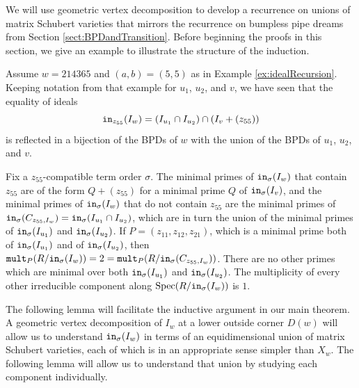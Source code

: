 \documentclass[12pt,reqno]{amsart}
\newtheorem{Main Conjecture}[theorem]{Main Conjecture}
\theoremstyle{remark}
\newenvironment{example}
  {\pushQED{\qed}\renewcommand{\qedsymbol}{$\diamondsuit$}\examplex}
  {\popQED\endexamplex}
\theoremstyle{plain}
\newcommand{\init}{{\tt in}}
\newcommand{\mult}{{\tt mult}}
\newcommand{\spec}{{\mbox{Spec}}}
\begin{document}
We will use geometric vertex decomposition to develop a recurrence on unions of matrix Schubert varieties that mirrors the recurrence on bumpless pipe dreams from Section \ref{sect:BPDandTransition}.  Before beginning the proofs in this section, we give an example to illustrate the structure of the induction. 

\begin{example}
Assume $w = 214365$ and $(a,b) = (5,5)$ as in Example \ref{ex:idealRecursion}.   Keeping notation from that example for $u_1$, $u_2$, and $v$, we have seen that the equality of ideals \[
\init_{z_{55}}(I_w) = (I_{u_1} \cap I_{u_2}) \cap (I_{v}+(z_{55}))
\] is reflected in a bijection of the BPDs of $w$ with the union of the BPDs of $u_1$, $u_2$, and $v$.

 Fix a $z_{55}$-compatible term order $\sigma$. The minimal primes of $\init_\sigma (I_w)$ that contain $z_{55}$ are of the form $Q+(z_{55})$ for a minimal prime $Q$ of $\init_\sigma(I_v)$, and the minimal primes of $\init_\sigma (I_w)$ that do not contain $z_{55}$ are the minimal primes of $\init_\sigma(C_{z_{55},I_w}) = \init_\sigma(I_{u_1} \cap I_{u_2})$, which are in turn the union of the minimal primes of $\init_\sigma(I_{u_1})$ and $\init_\sigma(I_{u_2})$.  If $P = (z_{11},z_{12},z_{21})$, which is a minimal prime both of $\init_\sigma(I_{u_1})$ and of $\init_\sigma(I_{u_2})$, then $\mult_P(R/\init_\sigma(I_w)) = 2=\mult_P(R/\init_\sigma(C_{z_{55},I_w}))$.  There are no other primes which are minimal over both $\init_\sigma(I_{u_1})$ and $\init_\sigma(I_{u_2})$.  The multiplicity of every other irreducible component along $\spec(R/\init_\sigma(I_w))$ is $1$.
\end{example}

The following lemma will facilitate the inductive argument in our main theorem.  A geometric vertex decomposition of $I_w$ at a lower outside corner $D(w)$ will allow us to understand $\init_\sigma(I_w)$ in terms of an equidimensional union of matrix Schubert varieties, each of which is in an appropriate sense simpler than $X_w$.  The following lemma will allow us to understand that union by studying each component individually.
\end{document}
